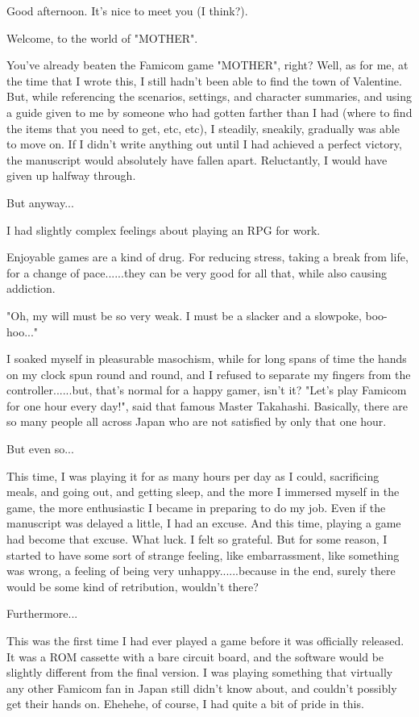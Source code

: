 \documentclass[
]{article}
\begin{document}
Good afternoon. It's nice to meet you (I think?).

Welcome, to the world of "MOTHER".

You've already beaten the Famicom game "MOTHER", right? Well, as for me,
at the time that I wrote this, I still hadn't been able to find the town
of Valentine. But, while referencing the scenarios, settings, and
character summaries, and using a guide given to me by someone who had
gotten farther than I had (where to find the items that you need to get,
etc, etc), I steadily, sneakily, gradually was able to move on. If I
didn't write anything out until I had achieved a perfect victory, the
manuscript would absolutely have fallen apart. Reluctantly, I would have
given up halfway through.

But anyway...

I had slightly complex feelings about playing an RPG for work.

Enjoyable games are a kind of drug. For reducing stress, taking a break
from life, for a change of pace......they can be very good for all that,
while also causing addiction.

"Oh, my will must be so very weak. I must be a slacker and a slowpoke,
boo-hoo..."

I soaked myself in pleasurable masochism, while for long spans of time
the hands on my clock spun round and round, and I refused to separate my
fingers from the controller......but, that's normal for a happy gamer,
isn't it? "Let's play Famicom for one hour every day!", said that famous
Master Takahashi. Basically, there are so many people all across Japan
who are not satisfied by only that one hour.

But even so...

This time, I was playing it for as many hours per day as I could,
sacrificing meals, and going out, and getting sleep, and the more I
immersed myself in the game, the more enthusiastic I became in preparing
to do my job. Even if the manuscript was delayed a little, I had an
excuse. And this time, playing a game had become that excuse. What luck.
I felt so grateful. But for some reason, I started to have some sort of
strange feeling, like embarrassment, like something was wrong, a feeling
of being very unhappy......because in the end, surely there would be
some kind of retribution, wouldn't there?

Furthermore...

This was the first time I had ever played a game before it was
officially released. It was a ROM cassette with a bare circuit board,
and the software would be slightly different from the final version. I
was playing something that virtually any other Famicom fan in Japan
still didn't know about, and couldn't possibly get their hands on.
Ehehehe, of course, I had quite a bit of pride in this.
\end{document}
